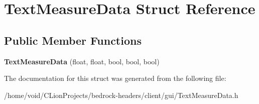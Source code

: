 \hypertarget{struct_text_measure_data}{}\section{Text\+Measure\+Data Struct Reference}
\label{struct_text_measure_data}
\subsection*{Public Member Functions}
\begin{DoxyCompactItemize}
\item 
\mbox{\label{struct_text_measure_data_aa28dbc6d3aa0579b60ac423e8f02dc1e}} 
{\bfseries Text\+Measure\+Data} (float, float, bool, bool, bool)
\end{DoxyCompactItemize}


The documentation for this struct was generated from the following file\+:\begin{DoxyCompactItemize}
\item 
/home/void/\+C\+Lion\+Projects/bedrock-\/headers/client/gui/Text\+Measure\+Data.\+h\end{DoxyCompactItemize}
